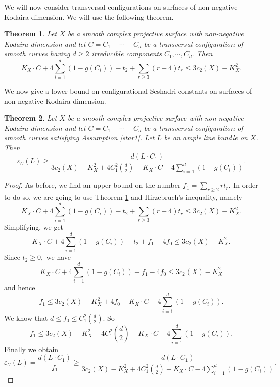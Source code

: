 \documentclass[12pt,reqno]{amsart}
\theoremstyle{plain}
\numberwithin{equation}{section}
\newtheorem{theorem}{Theorem}[section]
\theoremstyle{definition}
\begin{document}
	

	
	
	
	
	We will now consider transversal configurations on surfaces of non-negative Kodaira dimension. We will use the following theorem. 
	\begin{theorem}\cite[Theorem 2.1]{LP1} \label{LP}
		Let $X$ be a smooth complex projective surface with non-negative Kodaira dimension and let $C=C_1 + \cdots + C_d$ be a transversal configuration of smooth curves having $d\geq 2$ irreducible components $C_1, \cdots, C_d.$ Then
		\begin{equation*}
			K_X \cdot C + 4 \sum_{i=1}^{d} (1-g(C_i))-t_2+\sum_{r \geq 3} (r-4)t_r \leq 3c_2(X)-K_X^2.
		\end{equation*}
	\end{theorem}
	We now give a lower bound on configurational Seshadri constants on surfaces of non-negative Kodaira dimension.
	\begin{theorem}
		Let $X$ be a smooth complex projective surface with non-negative Kodaira dimension and let $C=C_1 + \cdots + C_d$ be a transversal configuration of smooth curves satisfying Assumption \ref{star1}. Let $L$ be an ample line bundle on $X$. Then
		$$\varepsilon_{\mathcal{C}}(
		L) \geq \frac{d(L\cdot C_1)}{3c_2(X)-K_X^2+4C_1^2 {d \choose 2}-K_X \cdot C-4 \sum_{i=1}^{d} (1-g(C_i))}.$$
	\end{theorem}
	\begin{proof}
		As before, we find an upper-bound on the number $f_{1} = \sum_{r\geq 2} rt_{r}$. In order to do so, we are going to use Theorem \ref{LP} and Hirzebruch's inequality, namely
		\begin{equation*}
			K_X \cdot C + 4 \sum_{i=1}^{d} (1-g(C_i))-t_2+\sum_{r \geq 3} (r-4)t_r \leq 3c_2(X)-K_X^2.
		\end{equation*}
		Simplifying, we get 
		\begin{equation*}
			K_X \cdot C + 4 \sum_{i=1}^{d} (1-g(C_i))+t_2+f_1-4f_0\leq 3c_2(X)-K_X^2.
		\end{equation*}	
		Since $t_2 \geq 0,$ we have 
		\begin{equation*}
			K_X \cdot C + 4 \sum_{i=1}^{d} (1-g(C_i))+f_1-4f_0\leq 3c_2(X)-K_X^2
		\end{equation*}	
		and hence 
		\begin{equation*}
			f_1\leq 3c_2(X)-K_X^2+4f_0-K_X \cdot C-4 \sum_{i=1}^{d} (1-g(C_i)).
		\end{equation*}	
		We know that
			$d \leq f_0 \leq C_1^2 {d \choose 2}$. So 
		\begin{equation*}
			f_1\leq 3c_2(X)-K_X^2+4C_1^2 {d \choose 2}-K_X \cdot C-4 \sum_{i=1}^{d} (1-g(C_i)). 
		\end{equation*}	
		Finally we obtain
		\begin{equation*}
			\varepsilon_\mathcal{C}(L)=\frac{d(L\cdot C_1)}{f_1} \geq \frac{d(L\cdot C_1)}{3c_2(X)-K_X^2+4C_1^2 {d \choose 2}-K_X \cdot C-4 \sum_{i=1}^{d} (1-g(C_i))}.
		\end{equation*}		
	\end{proof}
\end{document}
